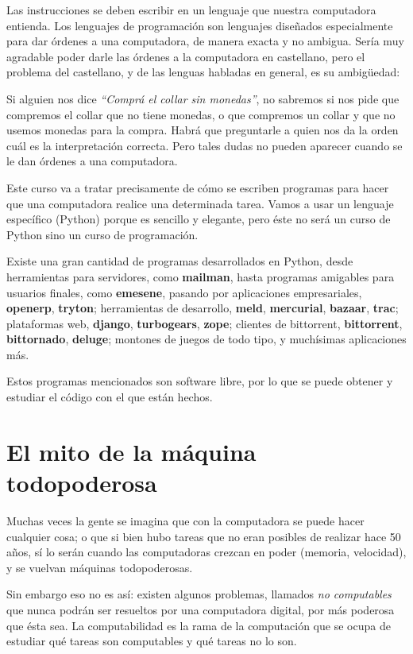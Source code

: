 Las instrucciones se deben escribir en un lenguaje que nuestra
computadora entienda. Los lenguajes de programación son
lenguajes diseñados especialmente para dar
órdenes a una computadora, de manera exacta y no ambigua. Sería
muy agradable poder darle las órdenes a la computadora en
castellano, pero el problema del castellano, y de las lenguas
habladas en general, es su ambigüedad:

Si alguien nos dice \emph{``Comprá el collar sin monedas''}, no sabremos
si nos pide que compremos el collar que no tiene monedas, o que compremos
un collar y que no usemos monedas para la compra. Habrá que preguntarle
a quien nos da la orden cuál es la interpretación correcta. Pero tales
dudas no pueden aparecer cuando se le dan órdenes a una computadora.

Este curso va a tratar precisamente de cómo se escriben programas
para hacer que una computadora realice una determinada tarea.
Vamos a usar un lenguaje específico (Python) porque es sencillo y
elegante, pero éste no será un curso de Python sino un curso de
programación.

\begin{sabias_que}
Existe una gran cantidad de programas desarrollados en Python, desde
herramientas para servidores, como {\bf mailman}, hasta programas amigables
para usuarios finales, como {\bf emesene}, pasando por aplicaciones
empresariales, {\bf openerp}, {\bf tryton}; herramientas de desarrollo,
{\bf meld}, {\bf mercurial}, {\bf bazaar}, {\bf trac}; plataformas web,
{\bf django}, {\bf turbogears}, {\bf zope}; clientes de bittorrent, {\bf
bittorrent}, {\bf bittornado}, {\bf deluge}; montones de juegos de todo
tipo, y muchísimas aplicaciones más.

Estos programas mencionados son software libre, por lo que se puede obtener y
estudiar el código con el que están hechos.
\end{sabias_que}

\section{El mito de la máquina todopoderosa}

Muchas veces la gente se imagina que con la computadora se puede
hacer cualquier cosa; o que si bien hubo tareas que no eran posibles de
realizar hace 50 años, sí lo serán cuando las computadoras crezcan en poder 
(memoria, velocidad), y se vuelvan máquinas todopoderosas.

Sin embargo eso no es así: existen algunos problemas, llamados
\emph{no computables} que nunca podrán ser resueltos por una
computadora digital, por más poderosa que ésta sea. La
computabilidad es la rama de la computación que se ocupa de
estudiar qué tareas son computables y qué tareas no lo son.


